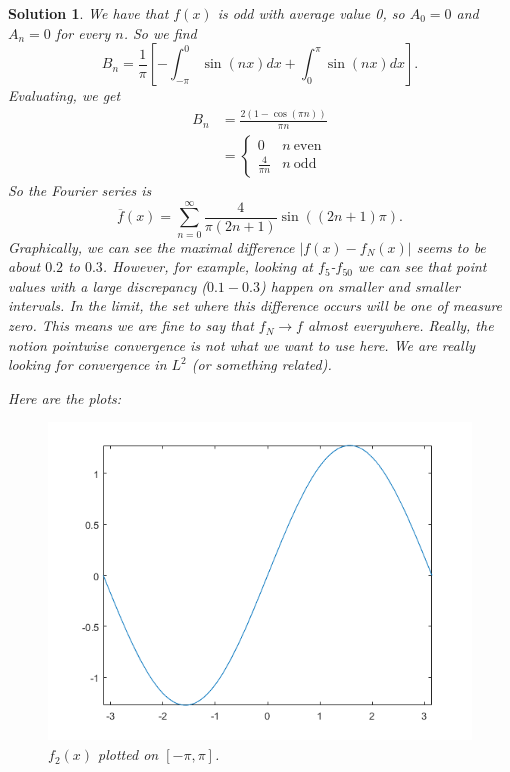 \documentclass[leqno]{article}
\theoremstyle{nonumberplain}
\newtheorem{solution}{Solution}
\begin{document}
\begin{solution}
We have that $f(x)$ is odd with average value 0, so $A_0=0$ and $A_n=0$ for every $n$.  So we find
\[
B_n=\frac{1}{\pi}\left[-\int_{-\pi}^0 \sin(nx)dx+\int_{0}^\pi \sin(nx)dx\right].
\]
Evaluating, we get
\begin{align*}
    B_n&=\frac{2(1-\cos(\pi n))}{\pi n}\\
    &= \begin{cases}
    0 & n ~\textrm{even}\\
    \frac{4}{\pi n} & n ~\textrm{odd}
    \end{cases}
\end{align*}
So the Fourier series is
\[
\overline{f}(x)=\sum_{n=0}^\infty \frac{4}{\pi (2n+1)} \sin((2n+1)\pi).
\]
Graphically, we can see the maximal difference $|f(x)-f_N(x)|$ seems to be about $0.2$ to $0.3$.  However, for example, looking at $f_5$-$f_{50}$ we can see that point values with a large discrepancy ($0.1-0.3$) happen on smaller and smaller intervals.  In the limit, the set where this difference occurs will be one of measure zero.  This means we are fine to say that $f_N\to f$ almost everywhere.  Really, the notion pointwise convergence is not what we want to use here.  We are really looking for convergence in $L^2$ (or something related).

Here are the plots:
\begin{figure}[h!]
    \centering
    \includegraphics{problem_3_10_hw_5.png}
    \caption{$f_2(x)$ plotted on $[-\pi,\pi]$.}
    \label{fig:my_label}
\end{figure}
\pagebreak


\end{solution}
\end{document}
